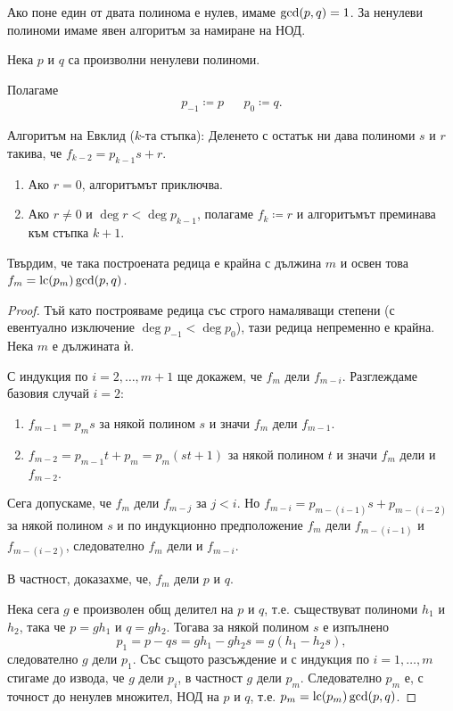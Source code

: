 \documentclass[numbers=endperiod, DIV=15]{scrartcl}
\begin{document}
Ако поне един от двата полинома е нулев, имаме $\operatorname{gcd}(p, q) = 1$. За ненулеви полиноми имаме явен алгоритъм за намиране на НОД.
\begin{theorem}
  Нека $p$ и $q$ са произволни ненулеви полиноми.

  Полагаме
  \begin{align*}
     p_{-1} \coloneqq p &&
     p_0 \coloneqq q.
  \end{align*}

  Алгоритъм на Евклид ($k$-та стъпка): Деленето с остатък ни дава полиноми $s$ и $r$ такива, че $f_{k-2} = p_{k-1} s + r$.
    \begin{enumerate}
      \item Ако $r = 0$, алгоритъмът приключва.
      \item Ако $r \neq 0$ и $\deg r < \deg p_{k-1}$, полагаме $f_k \coloneqq r$ и алгоритъмът преминава към стъпка $k + 1$.
    \end{enumerate}

  Твърдим, че така построената редица е крайна с дължина $m$ и освен това $f_m = \operatorname{lc}(p_m) \operatorname{gcd}(p, q)$.
\end{theorem}
\begin{proof}
  Тъй като построяваме редица със строго намаляващи степени (с евентуално изключение $\deg p_{-1} < \deg p_0$), тази редица непременно е крайна. Нека $m$ е дължината ѝ.

  С индукция по $i = 2, \ldots, m + 1$ ще докажем, че $f_m$ дели $f_{m-i}$. Разглеждаме базовия случай $i = 2$:
  \begin{enumerate}
    \item $f_{m-1} = p_m s$ за някой полином $s$ и значи $f_m$ дели $f_{m-1}$.
    \item $f_{m-2} = p_{m-1} t + p_m = p_m (s t + 1)$ за някой полином $t$ и значи $f_m$ дели и $f_{m-2}$.
  \end{enumerate}

  Сега допускаме, че $f_m$ дели $f_{m-j}$ за $j < i$. Но $f_{m-i} = p_{m-(i-1)} s + p_{m-(i-2)}$ за някой полином $s$ и по индукционно предположение $f_m$ дели $f_{m-(i-1)}$ и $f_{m-(i-2)}$, следователно $f_m$ дели и $f_{m-i}$.

  В частност, доказахме, че, $f_m$ дели $p$ и $q$.

  Нека сега $g$ е произволен общ делител на $p$ и $q$, т.е. съществуват полиноми $h_1$ и $h_2$, така че $p = g h_1$ и $q = g h_2$. Тогава за някой полином $s$ е изпълнено
  \begin{displaymath}
    p_1 = p - qs = g h_1 - g h_2 s = g (h_1 - h_2 s),
  \end{displaymath}
  следователно $g$ дели $p_1$. Със същото разсъждение и с индукция по $i = 1, \ldots, m$ стигаме до извода, че $g$ дели $p_i$, в частност $g$ дели $p_m$. Следователно $p_m$ е, с точност до ненулев множител, НОД на $p$ и $q$, т.е. $p_m = \operatorname{lc}(p_m) \operatorname{gcd}(p, q)$.
\end{proof}
\end{document}
